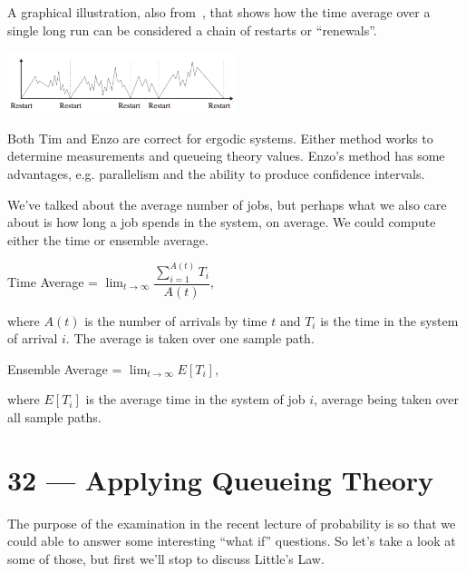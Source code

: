 \documentclass[a4paper]{report}
\begin{document}
A graphical illustration, also from~\cite{pmd}, that shows how the time average over a single long run can be considered a chain of restarts or ``renewals''.

\begin{center}
	\includegraphics[width=0.5\textwidth]{images/systemrestart.png}
\end{center}

Both Tim and Enzo are correct for ergodic systems. Either method works to determine measurements and queueing theory values. Enzo's method has some advantages, e.g. parallelism and the ability to produce confidence intervals.

We've talked about the average number of jobs, but perhaps what we also care about is how long a job spends in the system, on average. We could compute either the time or ensemble average. 

\begin{center}
	Time Average = $\lim_{t\to\infty}\dfrac{\sum_{i=1}^{A(t)} T_{i}}{A(t)},$
\end{center}

where $A(t)$ is the number of arrivals by time $t$ and $T_{i}$ is the time in the system of arrival $i$. The average is taken over one sample path.

\begin{center}
	Ensemble Average = $\lim_{t\to\infty}E[T_{i}],$
\end{center}

where $E[T_{i}]$ is the average time in the system of job $i$, average being taken over all sample paths.









\chapter*{32 --- Applying Queueing Theory}


The purpose of the examination in the recent lecture of probability is so that we could able to answer some interesting ``what if'' questions. So let's take a look at some of those, but first we'll stop to discuss Little's Law.
\end{document}
